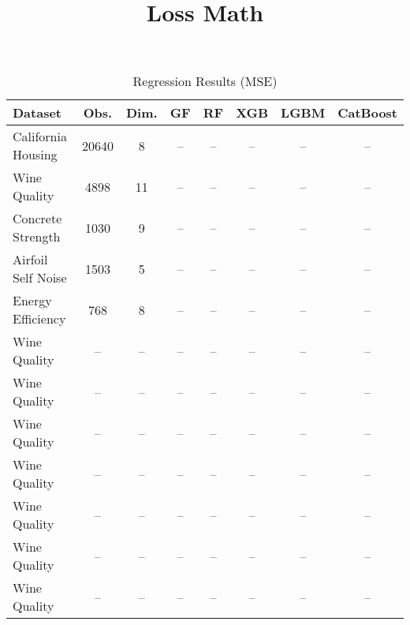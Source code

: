 \documentclass{article}
\begin{document}
\title{Loss Math}
\author{}
\date{}

\maketitle

\begin{table}[ht]
    \centering
    \caption{Regression Results (MSE)}
    \begin{tabular}{lccccccc}
    \hline
    Dataset & Obs. & Dim. & GF & RF & XGB & LGBM & CatBoost \\
    \hline
    California Housing & 20640 & 8 & -- & -- & -- & -- & -- \\
    Wine Quality          & 4898 & 11 & -- & -- & -- & -- & -- \\
    Concrete Strength          & 1030 & 9 & -- & -- & -- & -- & -- \\
    Airfoil Self Noise          & 1503 & 5 & -- & -- & -- & -- & -- \\
    Energy Efficiency          & 768 & 8 & -- & -- & -- & -- & -- \\
    Wine Quality          & -- & -- & -- & -- & -- & -- & -- \\
    Wine Quality          & -- & -- & -- & -- & -- & -- & -- \\
    Wine Quality          & -- & -- & -- & -- & -- & -- & -- \\
    Wine Quality          & -- & -- & -- & -- & -- & -- & -- \\
    Wine Quality          & -- & -- & -- & -- & -- & -- & -- \\
    Wine Quality          & -- & -- & -- & -- & -- & -- & -- \\
    Wine Quality          & -- & -- & -- & -- & -- & -- & -- \\
    \hline
    \end{tabular}
    \label{tab:regression_results}
    \end{table}
\end{document}
